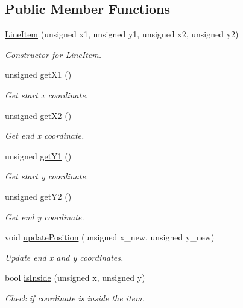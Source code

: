 \subsection*{Public Member Functions}
\begin{DoxyCompactItemize}
\item 
\mbox{\hyperlink{classLineItem_af79b99800cc44a69b53940bdb88ddd1b}{Line\+Item}} (unsigned x1, unsigned y1, unsigned x2, unsigned y2)
\begin{DoxyCompactList}\small\item\em Constructor for \mbox{\hyperlink{classLineItem}{Line\+Item}}. \end{DoxyCompactList}\item 
unsigned \mbox{\hyperlink{classLineItem_a8862ea60a3804d346e9801f79c67af76}{get\+X1}} ()
\begin{DoxyCompactList}\small\item\em Get start x coordinate. \end{DoxyCompactList}\item 
unsigned \mbox{\hyperlink{classLineItem_addce0ef5af72c233e2c7bf019c7a693d}{get\+X2}} ()
\begin{DoxyCompactList}\small\item\em Get end x coordinate. \end{DoxyCompactList}\item 
unsigned \mbox{\hyperlink{classLineItem_abbdf5be2637561802ea22385c7c11df5}{get\+Y1}} ()
\begin{DoxyCompactList}\small\item\em Get start y coordinate. \end{DoxyCompactList}\item 
unsigned \mbox{\hyperlink{classLineItem_aa99afab282d1e7e25b5d1549a41984d2}{get\+Y2}} ()
\begin{DoxyCompactList}\small\item\em Get end y coordinate. \end{DoxyCompactList}\item 
void \mbox{\hyperlink{classLineItem_acea090c7b9ff53dcc7a95ab7939b2cb9}{update\+Position}} (unsigned x\+\_\+new, unsigned y\+\_\+new)
\begin{DoxyCompactList}\small\item\em Update end x and y coordinates. \end{DoxyCompactList}\item 
bool \mbox{\hyperlink{classLineItem_af7dc675a032b27d6424536994095a95e}{is\+Inside}} (unsigned x, unsigned y)
\begin{DoxyCompactList}\small\item\em Check if coordinate is inside the item. \end{DoxyCompactList}\end{DoxyCompactItemize}
